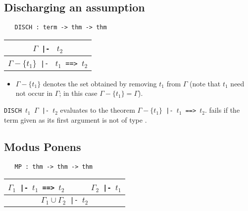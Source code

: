 \bigskip

\subsection{Discharging an assumption}


\begin{boxed}
\begin{verbatim}
   DISCH : term -> thm -> thm
\end{verbatim}\end{boxed}

\begin{center}
\begin{tabular}{c}
$\Gamma${\small\verb+ |- +} $t_2$ \\ \hline
$\Gamma{-}\{t_1\}${\small\verb+ |- +} $t_1${\small\verb+ ==> +}$t_2$
\end{tabular}
\end{center}

\begin{itemize}
\item  $\Gamma{-}\{t_1\}$ denotes the set obtained by removing $t_1$
from $\Gamma$ (note that $t_1$ need not occur in $\Gamma$; in this case
$\Gamma{-}\{t_1\} = \Gamma$).
\end{itemize}

\noindent
{\small\verb+DISCH +}$t_1${\small\verb+ +}$\Gamma${\small\verb+ |- +}$t_2$
evaluates to the theorem
$\Gamma{-}\{t_1\}${\small\verb+ |- +}$t_1${\small\verb+ ==> +}$t_2$.
 fails if the term given as its first argument is not of
type .



\bigskip

\subsection{Modus Ponens}


\begin{boxed}
\begin{verbatim}
   MP : thm -> thm -> thm
\end{verbatim}\end{boxed}

\begin{center}
\begin{tabular}{c}
$\Gamma_1${\small\verb+ |- +}$t_1${\small\verb+ ==> +}$t_2$ {\small\verb+     +} $\Gamma_2${\small\verb+ |- +}$t_1$ \\
\hline
$\Gamma_1 \cup \Gamma_2${\small\verb+ |- +}$t_2$ \\
\end{tabular}
\end{center}


